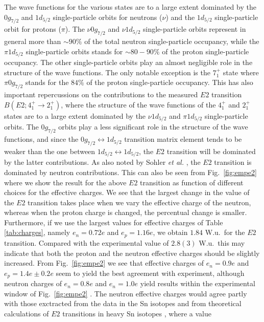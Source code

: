 \begin{multicols}{2}
The wave functions for the various states are to a large extent
dominated by the $0g_{7/2}$ and $1d_{5/2}$ single-particle orbits
for neutrons ($\nu$)
and the $1d_{5/2}$ single-particle
orbit for protons ($\pi$). 
The $\nu 0g_{7/2}$ and $\nu 1d_{5/2}$ single-particle orbits represent
in general more than $\sim 90\%$ of the total neutron single-particle
occupancy, while the  $\pi 1d_{5/2}$ single-particle orbits stands for 
$\sim 80-90\%$ of the proton single-particle occupancy. The other single-particle
orbits play  an almost negligible role in the structure of the wave functions.
The only notable exception is the $7_1^{+}$ state where $\pi 0g_{7/2}$
stands for the $84\%$ of the proton single-particle occupancy.
This has also important repercussions on the contributions to the
measured $E2$ transition $B(E2;4_1^+\rightarrow 2_1^+)$, where  the 
structure of the 
wave functions of the  
$4_1^+$ and $2_1^+$ states are to  a large extent dominated by the 
$\nu 1d_{5/2}$ and $\pi 1d_{5/2}$ single-particle orbits. The $0g_{7/2}$ orbits
play a less significant  role in the structure of the wave functions, 
and since the $0g_{7/2}\leftrightarrow 1d_{5/2}$ transition matrix element
tends to be weaker
than the  one  between $1d_{5/2}\leftrightarrow 1d_{5/2}$, the $E2$
transition will be dominated by  the latter contributions.
As also noted by Sohler {\em et al.} \cite{sb106}, the $E2$ transition is dominated by
neutron contributions.  This can also be seen from Fig.\  \ref{fig:empe2} 
where we show the result for the above $E2$ transition as function of 
different choices for the effective charges. 
We see that the largest change in the value of the $E2$ transition takes place
when we vary the effective charge of the neutron, whereas when the proton charge is
changed, the percentual change is smaller. 
Furthermore, if we use the largest values for effective charges of Table
\ref{tab:charges}, namely $e_n=0.72e$ and $e_p=1.16e$, we obtain $1.84$ W.u.\ for the
$E2$ transition. Compared with the experimental value
of $2.8(3)$ W.u.\ this may indicate that both the proton and the neutron effective
charges should be slightly increased. From Fig.\ 
\ref{fig:empe2} we see that effective charges of $e_n=0.9e $ and 
$e_p=1.4e\pm 0.2e$
seem to yield the best agreement with experiment, although
neutron charges of $e_n=0.8e$ and $e_n=1.0e$ yield results
within the experimental window of Fig.\ \ref{fig:empe2} . 
The neutron effective charges
would agree partly with those exctracted from the data in the Sn isotopes 
\cite{ssbw87} and from theoretical
calculations of $E2$ transitions in heavy Sn isotopes \cite{ehho98}, where a value

\end{multicols}

